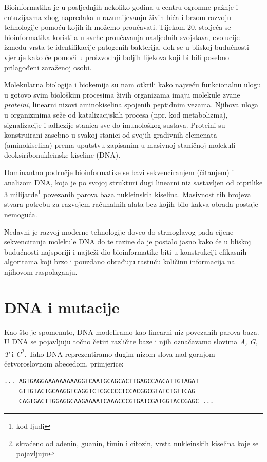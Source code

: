 \documentclass[times, utf8, diplomski]{fer}
\begin{document}
Bioinformatika je u posljednjih nekoliko godina u centru ogromne pažnje i entuzijazma zbog napredaka u razumijevanju živih bića i brzom razvoju tehnologije pomoću kojih ih možemo proučavati.
Tijekom 20. stoljeća se bioinformatika koristila u svrhe proučavanja nasljednih svojstava, evolucije između vrsta te identifikacije
patogenih bakterija, dok se u bliskoj budućnosti vjeruje kako će pomoći u proizvodnji boljih lijekova koji bi bili
posebno prilagođeni zaraženoj osobi.

Molekularna biologija i biokemija su nam otkrili kako najveću funkcionalnu ulogu u gotovo svim biološkim procesima
živih organizama imaju molekule zvane \emph{proteini}, linearni nizovi aminokiselina spojenih peptidnim vezama.
Njihova uloga u organizmima seže od katalizacijskih procesa (npr. kod metabolizma), signalizacije i adhezije stanica
sve do imunološkog sustava. Proteini su konstruirani zasebno u svakoj stanici od svojih gradivnih elemenata (aminokiselina) prema uputstvu zapisanim u masivnoj staničnoj molekuli
deoksiribonukleinske kiseline (DNA).

Dominantno područje bioinformatike se bavi sekvenciranjem (čitanjem) i analizom DNA, koja je po svojoj strukturi dugi linearni niz sastavljen od otprilike
3 milijarde\footnote{kod ljudi} povezanih parova baza nukleinskih kiselina. Masivnost tih brojeva stvara potrebu za razvojem računalnih alata
bez kojih bilo kakva obrada postaje nemoguća.

Nedavni je razvoj moderne tehnologije doveo do strmoglavog pada cijene sekvenciranja molekule DNA do te razine da je
postalo jasno kako će u bliskoj budućnosti najsporiji i najteži dio bioinformatike biti u konstrukciji efikasnih
algoritama koji brzo i pouzdano obrađuju rastuću količinu informacija na njihovom raspolaganju.

\section{DNA i mutacije}
Kao što je spomenuto, DNA modeliramo kao linearni niz povezanih parova baza. U DNA se pojavljuju točno četiri različite baze i njih
označavamo slovima \emph{A, G, T} i \emph{C}\footnote{skraćeno od adenin, guanin, timin i citozin, vrsta nukleinskih kiselina koje se pojavljuju}.
Tako DNA reprezentiramo dugim nizom slova nad gornjom četvoroslovnom abecedom, primjerice:

\begin{verbatim}
... AGTGAGGAAAAAAAAAGGTCAATGCAGCACTTGAGCCAACATTGTAGAT
    GTTGTACTGCAAGGTCAGGTCTCGCCCCTCCACGGCGTATCTGTTCAG
    CAGTGACTTGGAGGCAAGAAAATCAAACCCGTGATCGATGGTACCGAGC ...
\end{verbatim}
\end{document}
